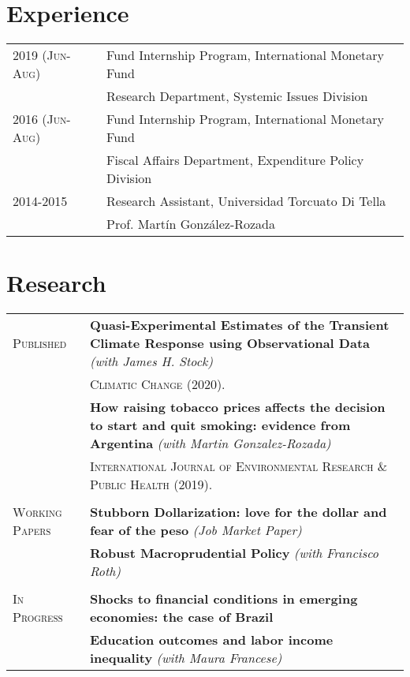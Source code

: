 \documentclass[letterpaper,9pt]{article} %
\begin{document}


\section{Experience}

\begin{tabular}{>{\raggedleft\arraybackslash}p{}|p{}}
	\textsc{2019 (Jun-Aug)} & Fund Internship Program, International Monetary Fund \\
	& \footnotesize{Research Department, Systemic Issues Division} \\
	\textsc{2016 (Jun-Aug)} & Fund Internship Program, International Monetary Fund \\
	& \footnotesize{Fiscal Affairs Department, Expenditure Policy Division} \\
	\textsc{2014-2015} & Research Assistant, Universidad Torcuato Di Tella \\
	& \footnotesize{Prof. Martín González-Rozada} \\

\end{tabular}

\section{Research}


\begin{tabular}{>{\raggedleft\arraybackslash}p{}|p{}}
	\textsc{Published} & \textbf{Quasi-Experimental Estimates of the Transient Climate Response using Observational Data} \emph{(with James H. Stock)} \\
	& \textsc{Climatic Change (2020).}\\
	& \textbf{How raising tobacco prices
		affects the decision to start and quit smoking: evidence from Argentina}   \emph{(with Martin Gonzalez-Rozada)} \\
	& \textsc{International
		Journal of Environmental Research \& Public Health (2019).} \\ \\
	\textsc{Working Papers} & \textbf{Stubborn Dollarization: love for the dollar and fear of the
	peso} \emph{(Job Market Paper)} \\
	& \textbf{Robust Macroprudential Policy} \emph{(with Francisco Roth)} \\ \\
	\textsc{In Progress} & \textbf{Shocks to financial conditions in emerging economies: the case
		of Brazil} \\	
	& \textbf{Education outcomes and labor income inequality}  \emph{(with Maura Francese)}
\end{tabular}
\end{document}
